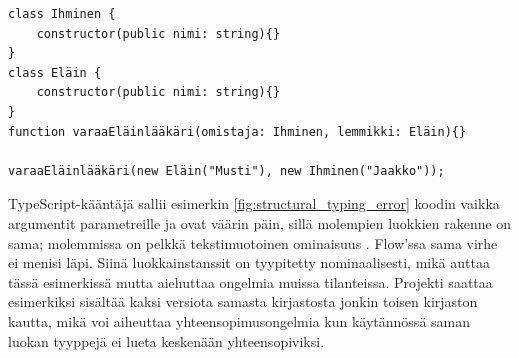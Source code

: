 \begin{lstlisting}[caption={
  Loogisen virheen sisältävä, mutta ilman varoituksia kääntyvä TypeScript-ohjelma.
}, label={fig:structural_typing_error}]
class Ihminen {
    constructor(public nimi: string){}
}
class Eläin {
    constructor(public nimi: string){}
}
function varaaEläinlääkäri(omistaja: Ihminen, lemmikki: Eläin){}

varaaEläinlääkäri(new Eläin("Musti"), new Ihminen("Jaakko"));
\end{lstlisting}
TypeScript-kääntäjä sallii esimerkin \ref{fig:structural_typing_error} koodin
vaikka argumentit parametreille\newline
{} ja 
ovat väärin päin, sillä molempien luokkien rakenne on sama; molemmissa on
pelkkä tekstimuotoinen ominaisuus . Flow'ssa sama virhe ei menisi läpi.
Siinä luokkainstanssit on tyypitetty nominaalisesti, mikä auttaa tässä
esimerkissä mutta aiehuttaa ongelmia muissa tilanteissa. Projekti saattaa
esimerkiksi sisältää kaksi versiota samasta kirjastosta jonkin toisen
kirjaston kautta, mikä voi aiheuttaa yhteensopimusongelmia kun käytännössä
saman luokan tyyppejä ei lueta keskenään yhteensopiviksi.
